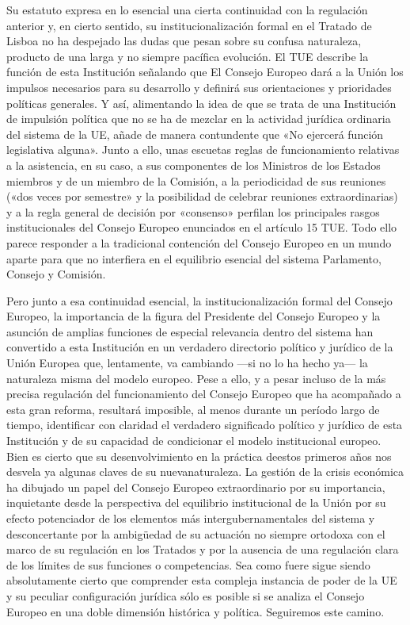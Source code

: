 \documentclass[10pt,a4paper]{article}
\begin{document}
Su estatuto expresa en lo esencial una cierta continuidad con la regulación anterior y, en cierto sentido, su institucionalización formal en el Tratado de Lisboa no ha despejado las dudas que pesan sobre su confusa naturaleza, producto de una larga y no siempre pacífica evolución. El TUE describe la función de esta Institución señalando  que El Consejo Europeo dará a la Unión los impulsos necesarios para su desarrollo y definirá sus orientaciones y prioridades políticas generales. Y así, alimentando la idea de que se trata de una Institución de impulsión política que no se ha de mezclar en la actividad jurídica ordinaria del sistema de la UE, añade de manera contundente que «No ejercerá función legislativa alguna». Junto a ello, unas escuetas reglas de funcionamiento relativas a la asistencia, en su caso, a sus componentes de los Ministros de los Estados miembros y de un miembro de la Comisión, a la periodicidad de sus reuniones («dos veces por semestre» y la posibilidad de celebrar reuniones extraordinarias) y a la regla general de decisión por «consenso» perfilan los principales rasgos institucionales del Consejo Europeo enunciados en el artículo 15 TUE. Todo ello parece responder a la tradicional contención del Consejo Europeo en un mundo aparte para que no interfiera en el equilibrio esencial del sistema Parlamento, Consejo y Comisión.

Pero junto a esa continuidad esencial, la institucionalización formal del Consejo Europeo, la importancia de la figura del Presidente del Consejo Europeo y la asunción de amplias funciones de especial relevancia dentro del sistema han convertido a esta Institución en un verdadero directorio político y jurídico de la Unión Europea que, lentamente, va cambiando —si no lo ha hecho ya— la naturaleza misma del modelo europeo. Pese a ello, y a pesar incluso de la más precisa regulación del funcionamiento del Consejo Europeo que ha acompañado a esta gran reforma, resultará imposible, al menos durante un período largo de tiempo, identificar con claridad el verdadero significado político y jurídico de esta Institución y de su capacidad de condicionar el modelo institucional europeo. Bien es cierto que su desenvolvimiento en la práctica deestos primeros años nos desvela ya algunas claves de su nuevanaturaleza. La gestión de la crisis económica ha dibujado un papel del Consejo Europeo extraordinario por su importancia, inquietante desde la perspectiva del equilibrio institucional de la Unión por su efecto potenciador de los elementos más intergubernamentales del sistema y desconcertante por la ambigüedad de su actuación no siempre ortodoxa con el marco de su regulación en los Tratados y por la ausencia de una regulación clara de los límites de sus funciones o competencias. Sea como fuere sigue siendo absolutamente cierto que comprender esta compleja instancia de poder de la UE y su peculiar configuración jurídica sólo es posible si se analiza el Consejo Europeo en una doble dimensión histórica y  política. Seguiremos este camino.
\end{document}
